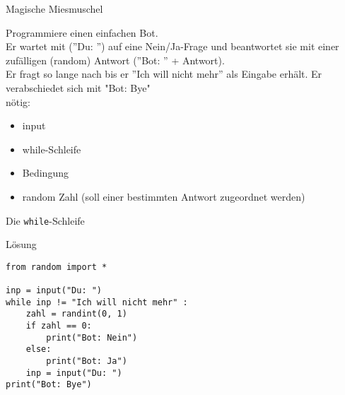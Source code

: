 \begin{frame}{Magische Miesmuschel}

	Programmiere einen einfachen Bot.\\ 
	Er wartet mit (''Du: '') auf eine Nein/Ja-Frage und
        beantwortet sie mit einer zufälligen (random) Antwort (''Bot: '' + Antwort). \\
	Er fragt so lange nach bis er ''Ich will nicht mehr'' als Eingabe erhält. Er verabschiedet sich mit "Bot: Bye"\\
	nötig:
	\begin{itemize}
		\item input
		\item while-Schleife
		\item Bedingung
		\item random Zahl (soll einer bestimmten Antwort zugeordnet werden)
	\end{itemize}		
\end{frame}

\begin{frame}[fragile]{Die \texttt{while}-Schleife}
\begin{exampleblock}{Lösung}
\begin{lstlisting}
from random import *

inp = input("Du: ")
while inp != "Ich will nicht mehr" :
	zahl = randint(0, 1)
	if zahl == 0:
		print("Bot: Nein")
	else:
		print("Bot: Ja")
	inp = input("Du: ")
print("Bot: Bye")
\end{lstlisting}
\end{exampleblock}
\end{frame}


